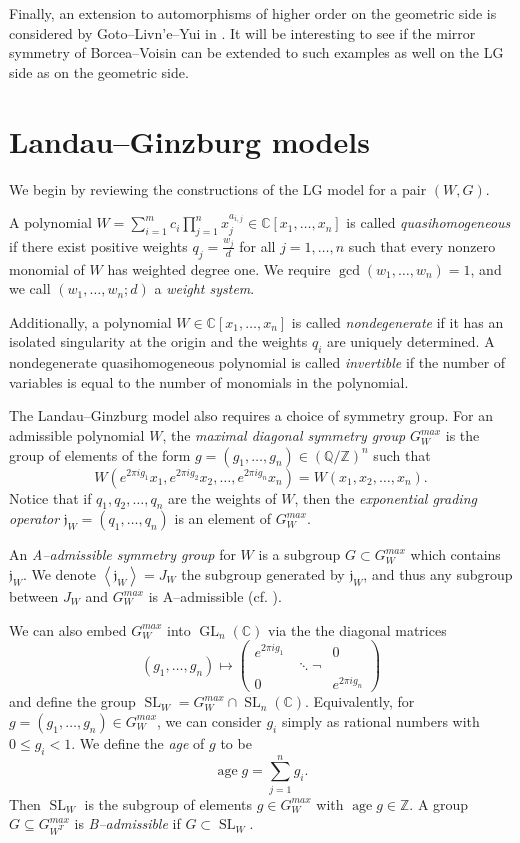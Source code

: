 \documentclass[10pt, letterpaper]{amsart}
\theoremstyle{remark}
\newcommand{\CC}{\mathbb C}
\newcommand{\ZZ}{\mathbb{Z}}
\newcommand{\jw}{\mathfrak{j}}
\newcommand{\defital}{\textit}
\DeclareMathOperator{\SL}{SL}
\DeclareMathOperator{\GL}{GL}
\DeclareMathOperator{\age}{age}
\newcommand{\nathan}[1]{\todo[color=pistachio,fancyline]{N:#1}}
\begin{document}
Finally, an extension to automorphisms of higher order on the geometric side is considered by Goto--Livn'e--Yui in \cite{GLY}. It will be interesting to see if the mirror symmetry of Borcea--Voisin can be extended to such examples as well on the LG side as on the geometric side.%




\section{Landau--Ginzburg models}\label{sec:LGmodels}
We begin by reviewing the constructions of the LG model for a pair $(W,G)$.

A polynomial 
$
W= \sum_{i=1}^m c_i\prod_{j = 1}^n x_j^{a_{i,j}}  \in \mathbb{C}[x_1, \ldots, x_n]
$
is called \defital{quasihomogeneous} if there exist positive weights $q_j=\tfrac{w_j}{d}$ for all  $j = 1, \ldots, n$ such that every nonzero monomial of $W$ has weighted degree one. We require $\gcd(w_1,\dots,w_n)=1$, and we call $(w_1,\dots,w_n;d)$ a \emph{weight system}.

Additionally, a polynomial $W \in \mathbb{C}[x_1, \ldots, x_n]$ is called \defital{nondegenerate} if it has an isolated singularity at the origin and the weights $q_i$ are uniquely determined.
A nondegenerate quasihomogeneous polynomial is called \emph{invertible} if the number of variables is equal to the number of monomials in the polynomial. 

The Landau--Ginzburg model also requires a choice of symmetry group. 
For an admissible polynomial $W$, the \defital{maximal diagonal symmetry group} $G_W^{max}$ is the group of elements of the form $g = (g_1, \ldots, g_n) \in \left(\mathbb{Q}/\ZZ\right)^n$ such that
\[
W(e^{2\pi i g_1}x_1,e^{2\pi i g_2}x_2,\ldots,e^{2\pi i g_n}x_n) = W(x_1,x_2,\ldots,x_n).
\]
\noindent Notice that if $q_1, q_2, \ldots, q_n$ are the weights of $W$, then the \emph{exponential grading operator} $\jw_W = (q_1, \ldots, q_n)$ is an element of $G_W^{max}$.  

An \defital{A--admissible symmetry group} for $W$ is a subgroup $G\subset G_W^{max}$ which contains $\jw_W$.   We denote $\left\langle \jw_W\right> = J_W$ the subgroup generated by $\jw_W$, and thus any subgroup between $J_W$ and $G_W^{max}$ is A--admissible (cf. \cite{Kr}). 

We can also embed $G_W^{max}$ into $\GL_n(\CC)$ via the the diagonal matrices
\[
(g_1,\dots,g_n)\mapsto \left(\begin{matrix}
                              e^{2\pi i g_1} & & 0 \\
			      & \ddots ¬ \\
			      0& & e^{2\pi i g_n}
                             \end{matrix}
 \right) 
\]
and define the group $\SL_W=G_W^{max}\cap \SL_n(\CC)$. Equivalently, for $g=(g_1,\dots,g_n)\in G^{max}_W$, we can consider $g_i$ simply as rational numbers with $0\leq g_i< 1$. We define the \emph{age} of $g$ to be 
\[
 \age g = \sum_{j=1}^n g_i. 
\]
Then $\SL_W$ is the subgroup of elements $g\in G^{max}_W$ with $\age g\in \ZZ$. A group $G\subseteq G^{max}_{W^T}$ is \emph{B--admissible} if $G\subset \SL_W$.
\end{document}
